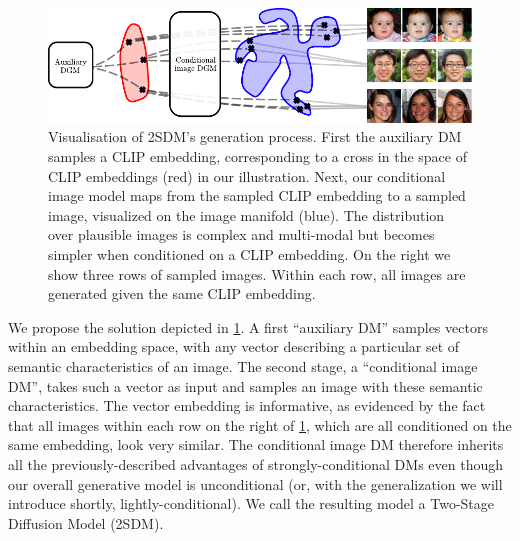 \begin{figure}[t]
    \centering
    \includegraphics[width=\textwidth]{figs/2sdm/vcdm-diagram.pdf}
    \caption{Visualisation of 2SDM's generation process. First the auxiliary DM samples a CLIP embedding, corresponding to a cross in the space of CLIP embeddings (red) in our illustration. Next, our conditional image model maps from the sampled CLIP embedding to a sampled image, visualized on the image manifold (blue). The distribution over plausible images is complex and multi-modal but becomes simpler when conditioned on a CLIP embedding. On the right we show three rows of sampled images. Within each row, all images are generated given the same CLIP embedding.}
    \label{fig:samples}
\end{figure}


We propose the solution depicted in \cref{fig:samples}. A first ``auxiliary DM'' samples vectors within an embedding space, with any vector describing a particular set of semantic characteristics of an image. The second stage, a ``conditional image DM'', takes such a vector as input and samples an image with these semantic characteristics. The vector embedding is informative, as evidenced by the fact that all images within each row on the right of \cref{fig:samples}, which are all conditioned on the same embedding, look very similar. The conditional image DM therefore inherits all the previously-described advantages of strongly-conditional DMs even though our overall generative model is unconditional (or, with the generalization we will introduce shortly, lightly-conditional). We call the resulting model a Two-Stage Diffusion Model (2SDM).


